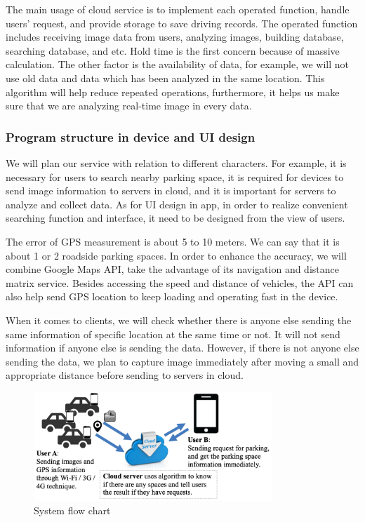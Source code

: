 \documentclass[runningheads,a4paper]{llncs}
\begin{document}
The main usage of cloud service is to implement each operated function,
handle users' request, and provide storage to save driving records. The
operated function includes receiving image data from users, analyzing
images, building database, searching database, and etc. Hold time is the
first concern because of massive calculation. The other factor is the
availability of data, for example, we will not use old data and data
which has been analyzed in the same location. This algorithm will help
reduce repeated operations, furthermore, it helps us make sure that we
are analyzing real-time image in every data.

%
\subsubsection{Program structure in device and UI design}
%

We will plan our service with relation to different characters. For
example, it is necessary for users to search nearby parking space, it is
required for devices to send image information to servers in cloud, and it
is important for servers to analyze and collect data. As for UI design
in app, in order to realize convenient searching function and interface,
it need to be designed from the view of users.

The error of GPS measurement is about 5 to 10 meters. We can say
that it is about 1 or 2 roadside parking spaces. In order to enhance the
accuracy, we will combine Google Maps API, take the advantage of its
navigation and distance matrix service. Besides accessing the speed and
distance of vehicles, the API can also help send GPS location to keep
loading and operating fast in the device.

When it comes to clients, we will check whether there is anyone else
sending the same information of specific location at the same time or
not. It will not send information if anyone else is sending the data.
However, if there is not anyone else sending the data, we plan to
capture image immediately after moving a small and appropriate distance
before sending to servers in cloud.

\begin{figure}[tbp]
	\centering
		\includegraphics[width=0.8\textwidth,natwidth=1053,natheight=482]{Figures/flowChart.png}
		\caption{System flow chart}
		\label{fig:system}
\end{figure}
\end{document}
